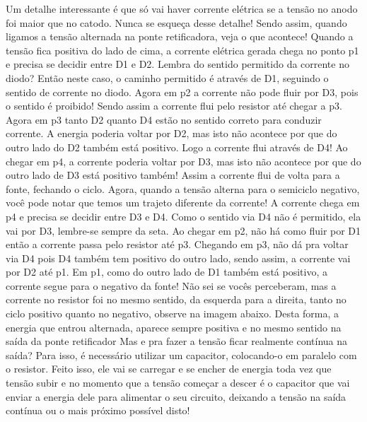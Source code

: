 \documentclass[a4paper,12pt]{article}
\begin{document}
Um detalhe interessante é que só vai haver corrente elétrica se a tensão no anodo foi maior que no catodo. Nunca se esqueça desse detalhe! Sendo assim, quando ligamos a tensão alternada na ponte retificadora, veja o que acontece! Quando a tensão fica positiva do lado de cima, a corrente elétrica gerada chega no ponto p1 e precisa se decidir entre D1 e D2.
Lembra do sentido permitido da corrente no diodo? Então neste caso, o caminho permitido é através de D1, seguindo o sentido de corrente no diodo.
Agora em p2 a corrente não pode fluir por D3, pois o sentido é proibido! Sendo assim a corrente flui pelo resistor até chegar a p3.
Agora em p3 tanto D2 quanto D4 estão no sentido correto para conduzir corrente. A energia poderia voltar por D2, mas isto não acontece por que do outro lado do D2 também está positivo. Logo a corrente flui através de D4!
Ao chegar em p4, a corrente poderia voltar por D3, mas isto não acontece por que do outro lado de D3 está positivo também! Assim a corrente flui de volta para a fonte, fechando o ciclo.
Agora, quando a tensão alterna para o semiciclo negativo, você pode notar que temos um trajeto diferente da corrente! A corrente chega em p4 e precisa se decidir entre D3 e D4.
Como o sentido via D4 não é permitido, ela vai por D3, lembre-se sempre da seta.
Ao chegar em p2, não há como fluir por D1 então a corrente passa pelo resistor até p3.
Chegando em p3, não dá pra voltar via D4 pois D4 também tem positivo do outro lado, sendo assim, a corrente vai por D2 até p1.
Em p1, como do outro lado de D1 também está positivo, a corrente segue para o negativo da fonte!
Não sei se vocês perceberam, mas a corrente no resistor foi no mesmo sentido, da esquerda para a direita, tanto no ciclo positivo quanto no negativo, observe na imagem abaixo. Desta forma, a energia que entrou alternada, aparece sempre positiva e no mesmo sentido na saída da ponte retificador
Mas e pra fazer a tensão ficar realmente contínua na saída? Para isso, é necessário utilizar um capacitor, colocando-o em paralelo com o resistor. Feito isso, ele vai se carregar e se encher de energia toda vez que tensão subir e no momento que a tensão começar a descer é o capacitor que vai enviar a energia dele para alimentar o seu circuito, deixando a tensão na saída contínua ou o mais próximo possível disto!
\end{document}
